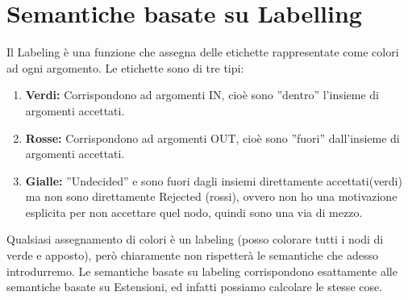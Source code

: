    \section{Semantiche basate su Labelling}
    Il Labeling è una funzione che assegna delle etichette rappresentate come
    colori ad ogni argomento. Le etichette sono di tre tipi:
    \begin{enumerate}
        \item \textbf{Verdi:} Corrispondono ad argomenti IN, cioè sono ”dentro”
              l'insieme di argomenti accettati.
        \item \textbf{Rosse:} Corrispondono ad argomenti OUT, cioè sono ”fuori”
              dall'insieme di argomenti accettati.
        \item \textbf{Gialle:} ”Undecided” e sono fuori dagli insiemi
              direttamente accettati(verdi) ma non sono direttamente Rejected (rossi),
              ovvero non ho una motivazione esplicita per non accettare quel nodo,
              quindi sono una via di mezzo.
    \end{enumerate}
    Qualsiasi assegnamento di colori è un labeling (posso colorare tutti i nodi
    di verde e apposto), però chiaramente non rispetterà le semantiche che
    adesso introdurremo. Le semantiche basate su labeling corrispondono
    esattamente alle semantiche basate su Estensioni, ed infatti possiamo
    calcolare le stesse cose.


